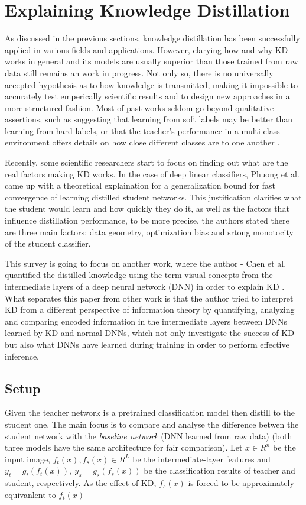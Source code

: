 \section{Explaining Knowledge Distillation}
As discussed in the previous sections, knowledge distillation has been successfully applied in various fields and applications. However, clarying how and why KD works in general and its models are usually superior than those trained from raw data still remains an work in progress. Not only so, there is no universally accepted hypothesis as to how knowledge is transmitted, making it impossible to accurately test emperically scientific results and to design new approaches in a more structured fashion. Most of past works seldom go beyond qualitative assertions, such as suggesting that learning from soft labels may be better than learning from hard labels, or that the teacher's performance in a multi-class environment offers details on how close different classes are to one another \cite{firstkdpaper,hintonfirstkd,featurebased03_relu}.

Recently, some scientific researchers start to focus on finding out what are the real factors making KD works. In the case of deep linear classifiers, Phuong et al. \cite{explainkd01_phuong} came up with a theoretical explaination for a generalization bound for fast convergence of learning distilled student networks. This justification clarifies what the student would learn and how quickly they do it, as well as the factors that influence distillation performance, to be more precise, the authors stated there are three main factors: data geometry, optimization bias and srtong monotocity of the student classifier. 

This survey is going to focus on another work, where the author - Chen et al. quantified the distilled knowledge using the term visual concepts from the intermediate layers of a deep neural network (DNN) in order to explain KD \cite{explainkd02_vconcepts}. What separates this paper from other work is that the author tried to interpret KD from a different perspective of information theory by quantifying, analyzing and comparing encoded information in the intermediate layers between DNNs learned by KD and normal DNNs, which not only investigate the success of KD but also what DNNs have learned during training in order to perform effective inference.

\subsection{Setup}
Given the teacher network is a pretrained classification model then distill to the student one. The main focus is to compare and analyse the difference betwen the student network with the \textit{baseline network} (DNN learned from raw data) (both three models have the same architecture for fair comparison). Let $x \in R^n$ be the input image, $f_t(x), f_s(x) \in R^L$ be the intermediate-layer features and $y_t = g_t(f_t(x)),\ y_s = g_s(f_s(x))$ be the classification results of teacher and student, respectively. As the effect of KD, $f_s(x)$ is forced to be approximately equivanlent to $f_t(x)$

